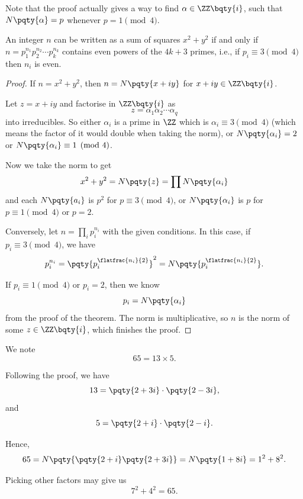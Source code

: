 Note that the proof actually gives a way to find \(\alpha \in \ZZ\bqty{i}\), such that \(N\pqty{\alpha} = p\) whenever \(p = 1 \pmod{4}\).

\begin{corollary}
    \label{cor:int-sum-of-two-qaures}%
    An integer \(n\) can be written as a sum of squares \(x^2 + y^2\) if and only if \(n = p_1 ^{n_1} p_2^{n_2} \cdots p_k^{n_k}\) contains even powers of the \(4k + 3\) primes, i.e., if \(p_i \equiv 3 \pmod{4}\) then \(n_i\) is even.
\end{corollary}

\begin{proof}
    If \(n = x^2 + y^2\), then \(n = N\pqty{x + iy}\) for \(x + iy \in \ZZ\bqty{i}\).

    Let \(z = x + iy\) and factorise in \(\ZZ\bqty{i}\) as
    \[
        z = \alpha_1 \alpha_2 \cdots \alpha_q
    \]
    into irreducibles. So either \(\alpha_i\) is a prime in \(\ZZ\) which is \(\alpha_i \equiv 3 \pmod{4}\) (which means the factor of it would double when taking the norm), or \(N\pqty{\alpha_i} = 2\) or \(N\pqty{\alpha_i} \equiv 1 \pmod{4}\).

    Now we take the norm to get
    \[
        x^2 + y^2 = N\pqty{z} = \prod N\pqty{\alpha_i}
    \]
    and each \(N\pqty{a_i}\) is \(p^2\) for \(p \equiv 3 \pmod{4}\), or \(N\pqty{\alpha_i}\) is \(p\) for \(p \equiv 1 \pmod{4}\) or \(p = 2\).

    Conversely, let \(n = \prod_i p_i^{n_i}\) with the given conditions. In this case, if \(p_i \equiv 3 \pmod{4}\), we have
    \[
        p_i^{n_i} = \pqty{p_i^{\flatfrac{n_i}{2}}}^2 = N\pqty{p_i^{\flatfrac{n_i}{2}}}.
    \]

    If \(p_i \equiv 1 \pmod{4}\) or \(p_i = 2\), then we know
    \[
        p_i = N \pqty{\alpha_i}
    \]
    from the proof of the theorem. The norm is multiplicative, so \(n\) is the norm of some \(z \in \ZZ\bqty{i}\), which finishes the proof.
\end{proof}

\begin{example}
    \label{ex:integers-sum-of-squares}%
    We note
    \[
        65 = 13 \times 5.
    \]

    Following the proof, we have
    \[
        13 = \pqty{2 + 3i} \cdot \pqty{2 - 3i},
    \]
    and
    \[
        5 = \pqty{2 + i} \cdot \pqty{2 - i}.
    \]

    Hence,
    \[
        65 = N\pqty{\pqty{2 + i} \pqty{2 + 3i}} = N\pqty{1 + 8i} = 1^2 + 8^2.
    \]

    Picking other factors may give us
    \[
        7^2 + 4^2 = 65.
    \]
\end{example}